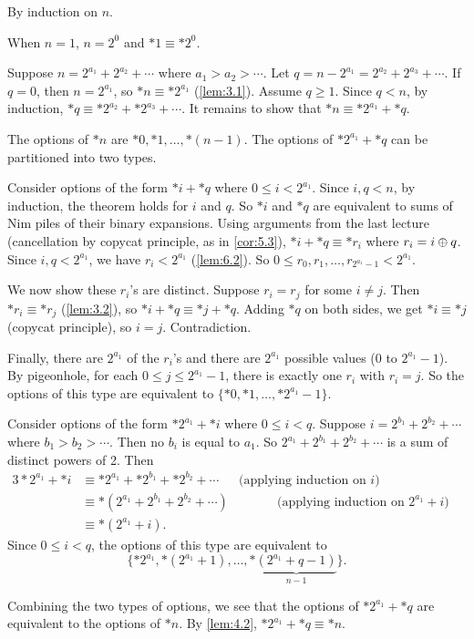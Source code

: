 \documentclass[12pt,letterpaper]{report}
\begin{document}
\begin{thmproof}
  By induction on $n$.

  When $n = 1$, $n = 2^0$ and $*1 \equiv *2^0$.

  Suppose $n = 2^{a_1} + 2^{a_2} + \cdots$ where $a_1 > a_2 > \cdots$.
  Let $q = n - 2^{a_1} = 2^{a_2} + 2^{a_3} + \cdots$.
  If $q = 0$, then $n = 2^{a_1}$, so $*n \equiv *2^{a_1}$ (\cref{lem:3.1}).
  Assume $q \geq 1$.
  Since $q < n$, by induction, $*q \equiv *2^{a_2} + *2^{a_3} + \cdots$.
  It remains to show that $*n \equiv *2^{a_1} + *q$.

  The options of $*n$ are $*0, *1, \ldots, *(n - 1)$.
  The options of $*2^{a_1} + *q$ can be partitioned into two types.
  \begin{enumcase}
    \item
      Consider options of the form $*i + *q$ where $0 \leq i < 2^{a_1}$.
      Since $i, q < n$, by induction, the theorem holds for $i$ and $q$.
      So $*i$ and $*q$ are equivalent to sums of Nim piles of their binary expansions.
      Using arguments from the last lecture (cancellation by copycat principle, as in
      \cref{cor:5.3}), $*i + *q \equiv *r_i$ where $r_i = i \oplus q$.
      Since $i, q < 2^{a_1}$, we have $r_i < 2^{a_1}$ (\cref{lem:6.2}).
      So $0 \leq r_0, r_1, \ldots, r_{2^{a_1} - 1} < 2^{a_1}$.

      We now show these $r_i$'s are distinct.
      Suppose $r_i = r_j$ for some $i \neq j$.
      Then $*r_i \equiv *r_j$ (\cref{lem:3.2}), so $*i + *q \equiv *j + *q$.
      Adding $*q$ on both sides, we get $*i \equiv *j$ (copycat principle), so $i = j$.
      Contradiction.

      Finally, there are $2^{a_1}$ of the $r_i$'s and there are $2^{a_1}$ possible values ($0$ to
      $2^{a_1} - 1$).
      By pigeonhole, for each $0 \leq j \leq 2^{a_1} - 1$, there is exactly one $r_i$ with
      $r_i = j$.
      So the options of this type are equivalent to $\{*0, *1, \ldots, *2^{a_1} - 1\}$.
    \item
      Consider options of the form $*2^{a_1} + *i$ where $0 \leq i < q$.
      Suppose $i = 2^{b_1} + 2^{b_2} + \cdots$ where $b_1 > b_2 > \cdots$.
      Then no $b_i$ is equal to $a_1$.
      So $2^{a_1} + 2^{b_1} + 2^{b_2} + \cdots$ is a sum of distinct powers of 2.
      Then
      \begin{alignat*}{3}
        *2^{a_1} + *i
        &\equiv *2^{a_1} + *2^{b_1} + *2^{b_2} + \cdots
          & \text{(applying induction on $i$)} && \\
        &\equiv *(2^{a_1} + 2^{b_1} + 2^{b_2} + \cdots)
          & \qquad\quad \text{(applying induction on $2^{a_1} + i$)} && \\
        &\equiv *(2^{a_1} + i). & &&
      \end{alignat*}
      Since $0 \leq i < q$, the options of this type are equivalent to
      \[ \{*2^{a_1}, *(2^{a_1} + 1), \ldots, *\underbrace{(2^{a_1} + q - 1)}_{n - 1}\}. \]
  \end{enumcase}
  Combining the two types of options, we see that the options of $*2^{a_1} + *q$ are equivalent to
  the options of $*n$.
  By \cref{lem:4.2}, $*2^{a_1} + *q \equiv *n$.
\end{thmproof}
\end{document}
